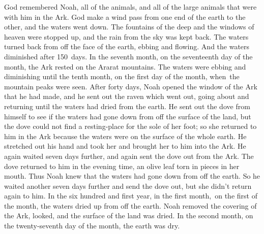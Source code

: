 
\begin{inparaenum}
   God remembered Noah, all of the animals, and all of the large animals that were with him in the Ark. God make a wind pass from one end of the earth to the other, and the waters went down.%
   The fountains of the deep and the windows of heaven were stopped up, and the rain from the sky was kept back.%
   The waters turned back from off the face of the earth, ebbing and flowing. And the waters diminished after 150~days.%
   In the seventh month, on the seventeenth day of the month, the Ark rested on the Ararat mountains.%
   The waters were ebbing and diminishing until the tenth month, on the first day of the month, when\understood{}\ the mountain peaks were seen.%
   After forty days, Noah opened the window of the Ark that he had made,%
   and he sent out the raven which went out, going about and returning until the waters had dried from the earth.%
   He sent out the dove from himself to see if the waters had gone down from off the surface of the land,%
   but the dove could not find a resting-place for the sole of her foot; so she returned to him in the Ark because the waters were on the surface of the whole earth. He stretched out his hand and took her and brought her to him into the Ark.%
   He again waited seven days further, and again sent the dove out from the Ark.%
   The dove returned to him in the evening time, an olive leaf torn in pieces in her mouth. Thus Noah knew that the waters had gone down from off the earth.%
   So he waited another seven days further and send the dove out, but she didn't return again to him.%
   In the six hundred and first year, in the first month,\understood{}\ on the first of the month, the waters dried up from off the earth. Noah removed the covering of the Ark, looked, and the surface of the land was dried.%
   In the second month, on the twenty-seventh day of the month, the earth was dry.%


\end{inparaenum}

